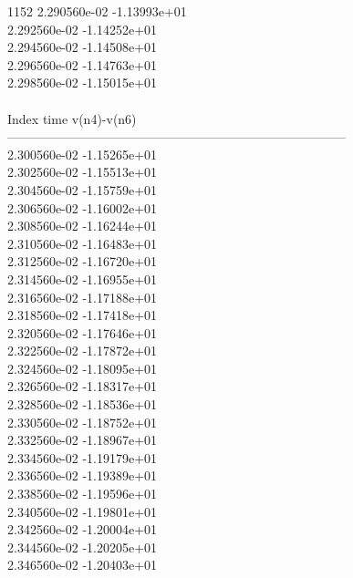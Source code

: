 1152	2.290560e-02	-1.13993e+01	\\ 	2.292560e-02	-1.14252e+01	\\ 	2.294560e-02	-1.14508e+01	\\ 	2.296560e-02	-1.14763e+01	\\ 	2.298560e-02	-1.15015e+01	\\ \hline
\\ \hline
Index   time            v(n4)-v(n6)     \\ \hline
--------------------------------------------------------------------------------\\ 	2.300560e-02	-1.15265e+01	\\ 	2.302560e-02	-1.15513e+01	\\ 	2.304560e-02	-1.15759e+01	\\ 	2.306560e-02	-1.16002e+01	\\ 	2.308560e-02	-1.16244e+01	\\ 	2.310560e-02	-1.16483e+01	\\ 	2.312560e-02	-1.16720e+01	\\ 	2.314560e-02	-1.16955e+01	\\ 	2.316560e-02	-1.17188e+01	\\ 	2.318560e-02	-1.17418e+01	\\ 	2.320560e-02	-1.17646e+01	\\ 	2.322560e-02	-1.17872e+01	\\ 	2.324560e-02	-1.18095e+01	\\ 	2.326560e-02	-1.18317e+01	\\ 	2.328560e-02	-1.18536e+01	\\ 	2.330560e-02	-1.18752e+01	\\ 	2.332560e-02	-1.18967e+01	\\ 	2.334560e-02	-1.19179e+01	\\ 	2.336560e-02	-1.19389e+01	\\ 	2.338560e-02	-1.19596e+01	\\ 	2.340560e-02	-1.19801e+01	\\ 	2.342560e-02	-1.20004e+01	\\ 	2.344560e-02	-1.20205e+01	\\ 	2.346560e-02	-1.20403e+01	\\ \hline
